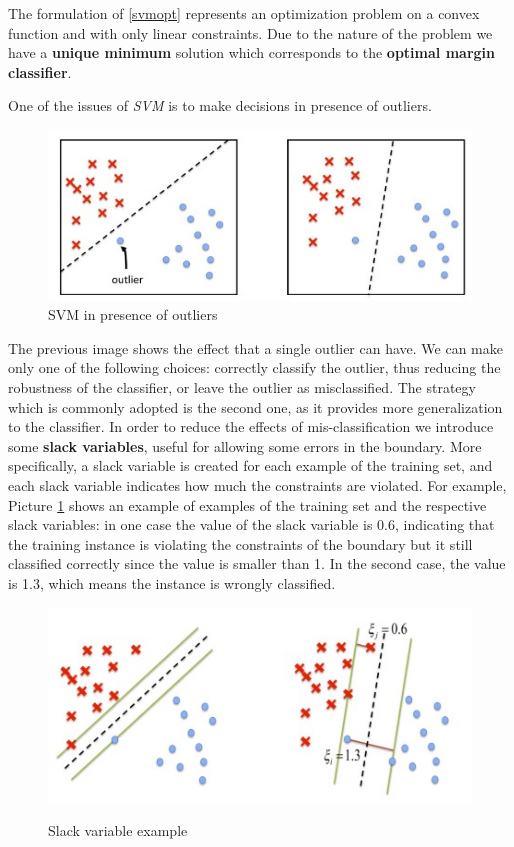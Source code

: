 The formulation of \ref{svmopt} represents an optimization problem on a convex function and with only linear constraints. Due to the nature of the problem we have a \textbf{unique minimum} solution which corresponds to the \textbf{optimal margin classifier}.

One of the issues of \textit{SVM} is to make decisions in presence of outliers.
\begin{figure}[h!]
		\centering
		\includegraphics[scale = 1.7]{img/outliers.jpg}
        \caption{SVM in presence of outliers}
\end{figure}
The previous image shows the effect that a single outlier can have. We can make only one of the following choices: correctly classify the outlier, thus reducing the robustness of the classifier, or leave the outlier as misclassified. The strategy which is commonly adopted is the second one, as it provides more generalization to the classifier. In order to reduce the effects of mis-classification we introduce some \textbf{slack variables}, useful for allowing some errors in the boundary. More specifically, a slack variable is created for each example of the training set, and each slack variable indicates how much the constraints are violated. For example, Picture \ref{slack} shows an example of examples of the training set and the respective slack variables: in one case the value of the slack variable is 0.6, indicating that the training instance is violating the constraints of the boundary but it still classified correctly since the value is smaller than 1. In the second case, the value is 1.3, which means the instance is wrongly classified.

\begin{figure}[h!]
		\centering
		\includegraphics[scale = 1.7]{img/soft margin.jpg}
        \label{slack}
        \caption{Slack variable example}
\end{figure}


